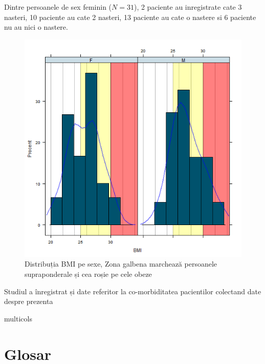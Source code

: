 \documentclass[11pt,draft]{article}
\makeatletter
\def\closeopenmulticols{%
   \def\@tempa{multicols}%
   \ifx\@tempa\@currenvir
      \end{multicols}%
  \fi 
}
\makeatother
\begin{document}
  \begin{multicols}{2}
  Dintre persoanele de sex feminin ($N=31$), 2 paciente au inregistrate cate 3 nasteri, 10 paciente au cate 2 nasteri, 13 paciente au cate o nastere si 6 paciente nu au nici o nastere.
  \begin{figure}[H]
    \centering
    \includegraphics[width=0.8\linewidth]{incobmiDens}
    \caption{Distribuția \ac{BMI} pe sexe, Zona galbena marchează persoanele supraponderale și cea roșie pe cele obeze}
    \label{fig:incobmiDens}
  \end{figure}
  
  Studiul a înregistrat și  date referitor la co-morbiditatea pacientilor colectand date despre prezenta 

  \closeopenmulticols
  
  
  
  \section*{Glosar}
  \begin{acronym}[LUTS]
  \end{acronym}
 
 \listoffigures
 \listoftables
   
\end{document}
